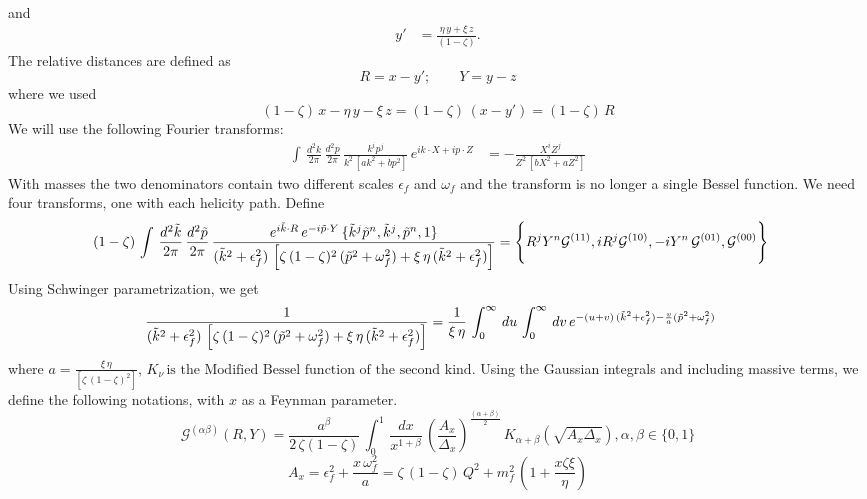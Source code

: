 \documentclass[9pt]{article}
\numberwithin{equation}{section}
\begin{document}
\begin{enumerate}
\begin{align}
\end{align}
and 
\begin{align}
    y' & = \frac{\eta\,y + \xi\,z}{(1-\zeta)}.
\end{align}
The relative distances are defined as 
$$R = x - y'; \hspace{2em} Y = y-z$$
where we used 
$$(1-\zeta)\,x - \eta\,y -\xi\,z = (1-\zeta)\, (x-y') = (1-\zeta)\,R$$
We will use the following Fourier transforms:
\begin{align}
    \int\, \frac{d^{2}k}{2\pi}\, \frac{d^{2}p}{2\pi}\, \frac{k^{i}p^{j}}{k^{2}\, \left[ak^{2}+bp^{2}\right]}\,e^{ik\cdot X + ip\cdot Z} & = -\frac{X^{i}Z^{j}}{Z^{2}\,\left[bX^{2}+aZ^{2}\right]}
\end{align}
With masses the two denominators contain two different scales $\epsilon_{f}$ and $\omega_{f}$ and the transform is no longer a single Bessel function. We need four transforms, one with each helicity path. Define
\begin{align}
    (1-\zeta)\, \int\, \frac{d^{2}\Tilde{k}}{2\pi}\, \frac{d^{2}\Tilde{p}}{2\pi}\, \frac{e^{i\Tilde{k}\cdot R}\, e^{-i\Tilde{p}\cdot Y}\, \{\Tilde{k}^{j}\Tilde{p}^{n}, \Tilde{k}^{j}, \Tilde{p}^{n}, 1\}}{(\Tilde{k}^{2}+\epsilon^{2}_{f})\, \left[\zeta\,(1-\zeta)^{2}\, (\Tilde{p}^{2}+\omega_{f}^{2}) + \xi\,\eta\,(\Tilde{k}^{2} + \epsilon^{2}_{f})\right]} & = \Bigg\{R^{j}Y^{n}\mathcal{G}^{(11)}, iR^{j}\mathcal{G}^{(10)}, -iY^{n}\,\mathcal{G}^{(01)}, \mathcal{G}^{(00)}\Bigg\}
\end{align}
Using Schwinger parametrization, we get
\begin{align}
    \frac{1}{(\Tilde{k}^{2}+\epsilon^{2}_{f})\,\left[\zeta\,(1-\zeta)^{2}\, (\Tilde{p}^{2}+\omega_{f}^{2}) + \xi\,\eta\,(\Tilde{k}^{2} + \epsilon^{2}_{f})\right]} & = \frac{1}{\xi\,\eta}\, \int_{0}^{\infty}\, du \, \int_{0}^{\infty}\, dv\, e^{-(u+v)\, (\Tilde{k}^{2}+\epsilon^{2}_{f})-\frac{v}{a}(\Tilde{p}^{2}+\omega^{2}_{f})}
\end{align}
where $a = \frac{\xi\, \eta}{\left[\zeta\,(1-\zeta)^{2}\right]},\, K_{\nu}\, \text{is the Modified Bessel function of the second kind}$. Using the Gaussian integrals and including massive terms, we define the following notations, with $x$ as a Feynman parameter.
$$\mathcal{G}^{(\alpha\beta)}(R,Y) = \frac{a^{\beta}}{2\,\zeta(1-\zeta)}\,\int_{0}^{1}\, \frac{dx}{x^{1+\beta}}\, \left(\frac{A_{x}}{\Delta_{x}}\right)^{\frac{(\alpha + \beta)}{2}}\,K_{\alpha + \beta} (\sqrt{A_{x}\Delta_{x}}), \alpha, \beta \in \{0,1\}$$
$$A_{x} = \epsilon^{2}_{f} + \frac{x\,\omega^{2}_{f}}{a} = \zeta\,(1-\zeta)\,Q^{2} +m^{2}_{f}\,\left(1+\frac{x\zeta\xi}{\eta}\right)$$

\end{enumerate}
\end{document}
